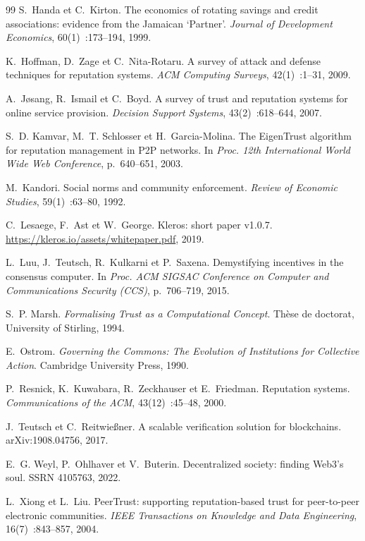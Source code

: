 \documentclass[11pt,a4paper]{article}
\theoremstyle{plain}
\theoremstyle{definition}
\theoremstyle{remark}
\newcommand{\1}{\mathbf{1}}
\begin{document}
\begin{thebibliography}{99}
S.~Handa et C.~Kirton.
The economics of rotating savings and credit associations: evidence from the
Jamaican `Partner'.
\emph{Journal of Development Economics}, 60(1)~:173--194, 1999.

K.~Hoffman, D.~Zage et C.~Nita-Rotaru.
A survey of attack and defense techniques for reputation systems.
\emph{ACM Computing Surveys}, 42(1)~:1--31, 2009.

A.~Jøsang, R.~Ismail et C.~Boyd.
A survey of trust and reputation systems for online service provision.
\emph{Decision Support Systems}, 43(2)~:618--644, 2007.

S.~D. Kamvar, M.~T. Schlosser et H.~Garcia-Molina.
The EigenTrust algorithm for reputation management in P2P networks.
In \emph{Proc. 12th International World Wide Web Conference}, p.~640--651, 2003.

M.~Kandori.
Social norms and community enforcement.
\emph{Review of Economic Studies}, 59(1)~:63--80, 1992.

C.~Lesaege, F.~Ast et W.~George.
Kleros: short paper v1.0.7.
\url{https://kleros.io/assets/whitepaper.pdf}, 2019.

L.~Luu, J.~Teutsch, R.~Kulkarni et P.~Saxena.
Demystifying incentives in the consensus computer.
In \emph{Proc. ACM SIGSAC Conference on Computer and Communications Security
(CCS)}, p.~706--719, 2015.

S.~P. Marsh.
\emph{Formalising Trust as a Computational Concept}.
Thèse de doctorat, University of Stirling, 1994.

E.~Ostrom.
\emph{Governing the Commons: The Evolution of Institutions for Collective
Action}. Cambridge University Press, 1990.

P.~Resnick, K.~Kuwabara, R.~Zeckhauser et E.~Friedman.
Reputation systems.
\emph{Communications of the ACM}, 43(12)~:45--48, 2000.

J.~Teutsch et C.~Reitwießner.
A scalable verification solution for blockchains.
arXiv:1908.04756, 2017.

E.~G. Weyl, P.~Ohlhaver et V.~Buterin.
Decentralized society: finding Web3's soul.
SSRN 4105763, 2022.

L.~Xiong et L.~Liu.
PeerTrust: supporting reputation-based trust for peer-to-peer electronic
communities.
\emph{IEEE Transactions on Knowledge and Data Engineering}, 16(7)~:843--857, 2004.

\end{thebibliography}
\end{document}
